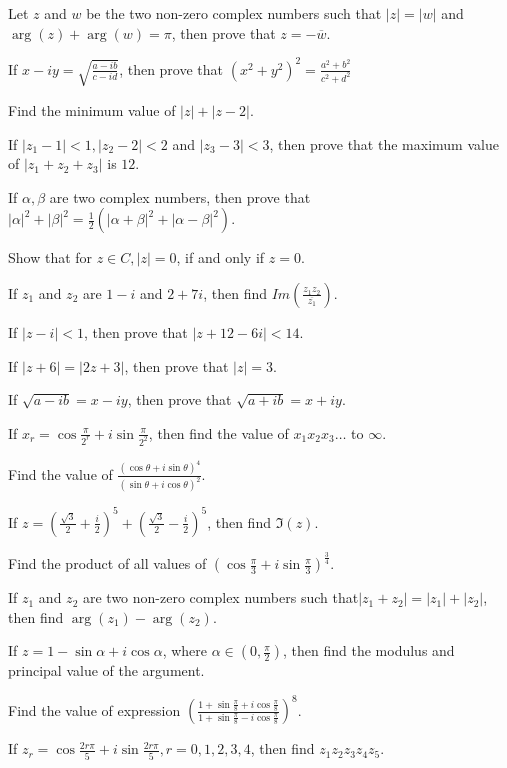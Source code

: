 \item Let $z$ and $w$ be the two non-zero complex numbers such that $|z| = |w|$ and $\arg(z) + \arg(w) = \pi$, then prove that $z =
  -\overline{w}$.
\item If $x - iy = \sqrt{\frac{a - ib}{c - id}}$, then prove that $(x^2 + y^2)^2 = \frac{a^2 + b^2}{c^2 + d^2}$
\item Find the minimum value of $|z| + |z - 2|$.
\item If $|z_1 - 1|< 1, |z_2 - 2| < 2$ and $|z_3 - 3|< 3$, then prove that the maximum value of $|z_1 + z_2 + z_3|$ is $12$.
\item If $\alpha, \beta$ are two complex numbers, then prove that $|\alpha|^2 + |\beta|^2 = \frac{1}{2}(|\alpha + \beta|^2 +
  |\alpha - \beta|^2)$.
\item Show that for $z\in C, |z| = 0$, if and only if $z = 0$.
\item If $z_1$ and $z_2$ are $1 - i$ and $2 + 7i$, then find $Im\left(\frac{z_1z_2}{\overline{z_1}}\right)$.
\item If $|z - i|< 1$, then prove that $|z + 12 - 6i| < 14$.
\item If $|z + 6| = |2z + 3|$, then prove that $|z| = 3$.
\item If $\sqrt{a - ib} = x -iy$, then prove that $\sqrt{a + ib} = x + iy$.
\item If $x_r = \cos\frac{\pi}{2^r} + i\sin\frac{\pi}{2^2}$, then find the value of $x_1x_2x_3\ldots$ to $\infty$.
\item Find the value of $\frac{(\cos\theta + i\sin\theta)^4}{(\sin\theta + i\cos\theta)^2}$.
\item If $z = \left(\frac{\sqrt{3}}{2} + \frac{i}{2}\right)^5 + \left(\frac{\sqrt{3}}{2} - \frac{i}{2}\right)^5$, then find
  $\Im(z)$.
\item Find the product of all values of $\left(\cos\frac{\pi}{3} + i\sin\frac{\pi}{3}\right)^{\frac{3}{4}}$.
\item If $z_1$ and $z_2$ are two non-zero complex numbers such that$|z_1 + z_2| = |z_1| + |z_2|$, then find $\arg(z_1) - \arg(z_2)$.
\item If $z = 1 - \sin\alpha + i\cos\alpha$, where $\alpha \in \left(0, \frac{\pi}{2}\right)$, then find the modulus and principal
  value of the argument.
\item Find the value of expression $\left(\frac{1 + \sin\frac{\pi}{8} + i\cos\frac{\pi}{8}}{1 + \sin\frac{\pi}{8} -
  i\cos\frac{\pi}{8}}\right)^8$.
\item If $z_r = \cos\frac{2r\pi}{5} + i\sin\frac{2r\pi}{5}, r = 0, 1, 2, 3, 4$, then find $z_1z_2z_3z_4z_5$.
